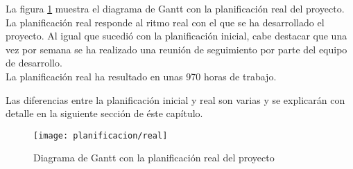 La figura \ref{fig:gantt_real} muestra el diagrama de Gantt con la planificación real del proyecto.  La planificación real responde al ritmo real con el que se ha desarrollado el proyecto.  Al igual que sucedió con la planificación inicial, cabe destacar que una vez por semana se ha realizado una reunión de seguimiento por parte del equipo de desarrollo.\\
La planificación real ha resultado en unas 970 horas de trabajo.

Las diferencias entre la planificación inicial y real son varias y se explicarán con detalle en la siguiente sección de éste capítulo.

\begin{figure}[h]
	\centering
	\texttt{[image: planificacion/real]}
	\caption{Diagrama de Gantt con la planificación real del proyecto}
	\label{fig:gantt_real}
\end{figure}